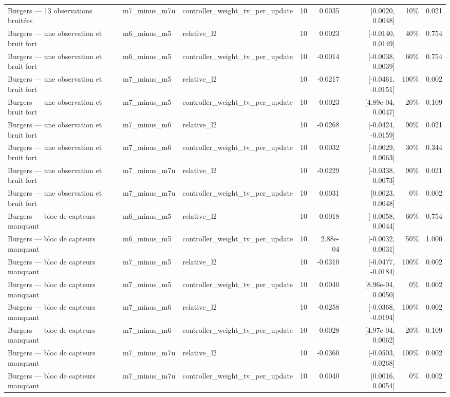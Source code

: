 \begin{tabular}{llllrrrr}
Burgers — 13 observations bruitées & m7\_minus\_m7u & controller\_weight\_tv\_per\_update & 10 & 0.0035 & [0.0020, 0.0048] & 10\% & 0.021 \\
Burgers — une observation et bruit fort & m6\_minus\_m5 & relative\_l2 & 10 & 0.0023 & [-0.0140, 0.0149] & 40\% & 0.754 \\
Burgers — une observation et bruit fort & m6\_minus\_m5 & controller\_weight\_tv\_per\_update & 10 & -0.0014 & [-0.0038, 0.0039] & 60\% & 0.754 \\
Burgers — une observation et bruit fort & m7\_minus\_m5 & relative\_l2 & 10 & -0.0217 & [-0.0461, -0.0151] & 100\% & 0.002 \\
Burgers — une observation et bruit fort & m7\_minus\_m5 & controller\_weight\_tv\_per\_update & 10 & 0.0023 & [4.89e-04, 0.0047] & 20\% & 0.109 \\
Burgers — une observation et bruit fort & m7\_minus\_m6 & relative\_l2 & 10 & -0.0268 & [-0.0424, -0.0159] & 90\% & 0.021 \\
Burgers — une observation et bruit fort & m7\_minus\_m6 & controller\_weight\_tv\_per\_update & 10 & 0.0032 & [-0.0029, 0.0063] & 30\% & 0.344 \\
Burgers — une observation et bruit fort & m7\_minus\_m7u & relative\_l2 & 10 & -0.0229 & [-0.0338, -0.0073] & 90\% & 0.021 \\
Burgers — une observation et bruit fort & m7\_minus\_m7u & controller\_weight\_tv\_per\_update & 10 & 0.0031 & [0.0023, 0.0048] & 0\% & 0.002 \\
Burgers — bloc de capteurs manquant & m6\_minus\_m5 & relative\_l2 & 10 & -0.0018 & [-0.0058, 0.0044] & 60\% & 0.754 \\
Burgers — bloc de capteurs manquant & m6\_minus\_m5 & controller\_weight\_tv\_per\_update & 10 & 2.88e-04 & [-0.0032, 0.0031] & 50\% & 1.000 \\
Burgers — bloc de capteurs manquant & m7\_minus\_m5 & relative\_l2 & 10 & -0.0310 & [-0.0477, -0.0184] & 100\% & 0.002 \\
Burgers — bloc de capteurs manquant & m7\_minus\_m5 & controller\_weight\_tv\_per\_update & 10 & 0.0040 & [8.96e-04, 0.0050] & 0\% & 0.002 \\
Burgers — bloc de capteurs manquant & m7\_minus\_m6 & relative\_l2 & 10 & -0.0258 & [-0.0368, -0.0194] & 100\% & 0.002 \\
Burgers — bloc de capteurs manquant & m7\_minus\_m6 & controller\_weight\_tv\_per\_update & 10 & 0.0028 & [4.97e-04, 0.0062] & 20\% & 0.109 \\
Burgers — bloc de capteurs manquant & m7\_minus\_m7u & relative\_l2 & 10 & -0.0360 & [-0.0503, -0.0268] & 100\% & 0.002 \\
Burgers — bloc de capteurs manquant & m7\_minus\_m7u & controller\_weight\_tv\_per\_update & 10 & 0.0040 & [0.0016, 0.0054] & 0\% & 0.002 \\
\bottomrule
\end{tabular}
